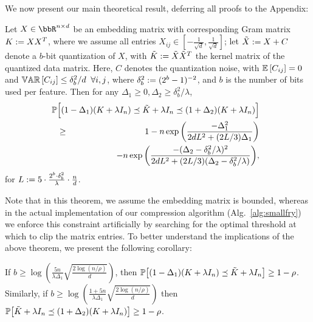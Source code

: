 We now present our main theoretical result, deferring all proofs to the Appendix:
\begin{theorem}
	\label{thm:main}
	Let $X \in \RR^{n\times d}$ be an embedding matrix with corresponding Gram matrix $K \defeq XX^T$, where we assume all entries $X_{ij} \in [-\frac{1}{\sqrt{d}},\frac{1}{\sqrt{d}}]$; let $\tX\defeq X+C$ denote a $b$-bit quantization of $X$, with $\tK \defeq \tX\tX^T$ the kernel matrix of the quantized data matrix. Here, $C$ denotes the quantization noise, with $\expect{}{C_{ij}} = 0$ and $\var{}{C_{ij}} \leq \delta_b^2/d \;\;\forall i,j$, where $\delta_b^2 \defeq (2^b-1)^{-2}$, and $b$ is the number of bits used per feature.
	Then for any $\Delta_1 \geq 0, \Delta_2 \geq \delta^2_b/\lambda$,
	\begin{eqnarray*}
	&&\hspace{-0.37in}\Prob\Big[(1- \Delta_1) (K + \lambda I_n) \preceq \tK + \lambda I_n \preceq (1 + \Delta_2) (K + \lambda I_n)
	\Big] 
	\\ &\geq& 1 - 
	n \exp \bigg(\frac{-\Delta_1^2}{2dL^2 + (2L/3)\Delta_1}\bigg) \\
	&&- n \exp \bigg(\frac{-(\Delta_2-\delta_b^2/\lambda)^2}{2dL^2 + (2L/3)(\Delta_2-\delta_b^2/\lambda)}\bigg),
	\end{eqnarray*}
	for $L \defeq 5 \cdot \frac{2^b \cdot \delta_b^2}{\lambda}\cdot \frac{n}{d}$.
\end{theorem}
Note that in this theorem, we assume the embedding matrix is bounded, whereas in the actual implementation of our compression algorithm (Alg.~\ref{alg:smallfry}) we enforce this constraint artificially by searching for the optimal threshold at which to clip the matrix entries.
To better understand the implications of the above theorem, we present the following corollary:
\begin{corollary}
	\label{cor:main}
	If $b \geq \log\left(\frac{5n}{\lambda \Delta_1} \sqrt{\frac{2\log(n/\rho)}{d}} \right)$,
	then $\Prob\big[(1 - \Delta_1) (K + \lambda I_n) \preceq \tK + \lambda I_n \big] \geq  1 - \rho$. 
	Similarly, if $b \geq \log\left(\frac{1+5n}{\lambda \Delta_1} \sqrt{\frac{2\log(n/\rho)}{d}} \right)$
	then $\Prob\big[\tK + \lambda I_n \preceq (1 + \Delta_2) (K + \lambda I_n)\big] \geq  1 - \rho$. 
\end{corollary}

